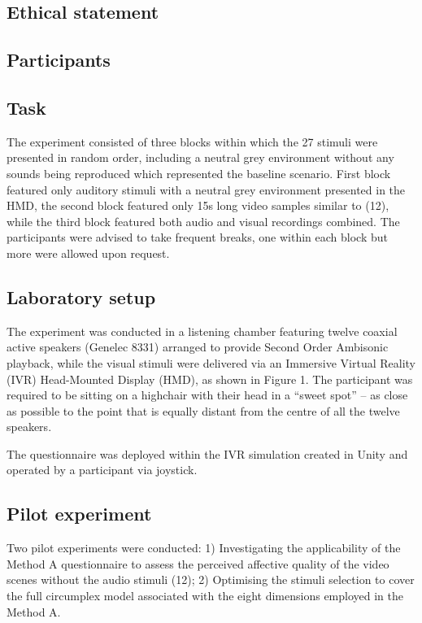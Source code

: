 \documentclass[
  authoryear,
  3p]{elsarticle}
\begin{document}
\subsection{Ethical statement}\label{ethical-statement}

\subsection{Participants}\label{participants}

\subsection{Task}\label{task}

The experiment consisted of three blocks within which the 27 stimuli
were presented in random order, including a neutral grey environment
without any sounds being reproduced which represented the baseline
scenario. First block featured only auditory stimuli with a neutral grey
environment presented in the HMD, the second block featured only 15s
long video samples similar to (12), while the third block featured both
audio and visual recordings combined. The participants were advised to
take frequent breaks, one within each block but more were allowed upon
request.

\subsection{Laboratory setup}\label{laboratory-setup}

The experiment was conducted in a listening chamber featuring twelve
coaxial active speakers (Genelec 8331) arranged to provide Second Order
Ambisonic playback, while the visual stimuli were delivered via an
Immersive Virtual Reality (IVR) Head-Mounted Display (HMD), as shown in
Figure 1. The participant was required to be sitting on a highchair with
their head in a ``sweet spot'' -- as close as possible to the point that
is equally distant from the centre of all the twelve speakers.

The questionnaire was deployed within the IVR simulation created in
Unity and operated by a participant via joystick.

\subsection{Pilot experiment}\label{pilot-experiment}

Two pilot experiments were conducted: 1) Investigating the applicability
of the Method A questionnaire to assess the perceived affective quality
of the video scenes without the audio stimuli (12); 2) Optimising the
stimuli selection to cover the full circumplex model associated with the
eight dimensions employed in the Method A.
\end{document}
